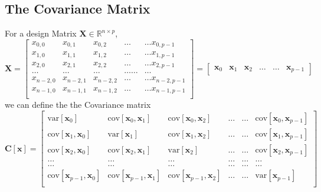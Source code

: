 \documentclass[11pt,a4paper,notitlepage]{article}
\begin{document}
\subsection{The Covariance Matrix}
For a design Matrix $\boldsymbol{X}\in {\mathbb{R}}^{n\times p}$, 
\begin{equation}
\boldsymbol{X}=\begin{bmatrix}
x_{0,0} & x_{0,1} & x_{0,2}& \dots & \dots x_{0,p-1}\\
x_{1,0} & x_{1,1} & x_{1,2}& \dots & \dots x_{1,p-1}\\
x_{2,0} & x_{2,1} & x_{2,2}& \dots & \dots x_{2,p-1}\\
\dots & \dots & \dots & \dots \dots & \dots \\
x_{n-2,0} & x_{n-2,1} & x_{n-2,2}& \dots & \dots x_{n-2,p-1}\\
x_{n-1,0} & x_{n-1,1} & x_{n-1,2}& \dots & \dots x_{n-1,p-1}\\
\end{bmatrix}=\begin{bmatrix} \boldsymbol{x}_0 & \boldsymbol{x}_1 & \boldsymbol{x}_2 & \dots & \dots & \boldsymbol{x}_{p-1}\end{bmatrix}
\end{equation}
we can define the the Covariance matrix
\begin{equation}
\boldsymbol{C}[\boldsymbol{x}] = \begin{bmatrix}
\mathrm{var}[\boldsymbol{x}_0] & \mathrm{cov}[\boldsymbol{x}_0,\boldsymbol{x}_1]  & \mathrm{cov}[\boldsymbol{x}_0,\boldsymbol{x}_2] & \dots & \dots & \mathrm{cov}[\boldsymbol{x}_0,\boldsymbol{x}_{p-1}]\\
\mathrm{cov}[\boldsymbol{x}_1,\boldsymbol{x}_0] & \mathrm{var}[\boldsymbol{x}_1]  & \mathrm{cov}[\boldsymbol{x}_1,\boldsymbol{x}_2] & \dots & \dots & \mathrm{cov}[\boldsymbol{x}_1,\boldsymbol{x}_{p-1}]\\
\mathrm{cov}[\boldsymbol{x}_2,\boldsymbol{x}_0]   & \mathrm{cov}[\boldsymbol{x}_2,\boldsymbol{x}_1] & \mathrm{var}[\boldsymbol{x}_2] & \dots & \dots & \mathrm{cov}[\boldsymbol{x}_2,\boldsymbol{x}_{p-1}]\\
\dots & \dots & \dots & \dots & \dots & \dots \\
\dots & \dots & \dots & \dots & \dots & \dots \\
\mathrm{cov}[\boldsymbol{x}_{p-1},\boldsymbol{x}_0]   & \mathrm{cov}[\boldsymbol{x}_{p-1},\boldsymbol{x}_1] & \mathrm{cov}[\boldsymbol{x}_{p-1},\boldsymbol{x}_{2}]  & \dots & \dots  & \mathrm{var}[\boldsymbol{x}_{p-1}]\\
\end{bmatrix}
\end{equation}
\end{document}
